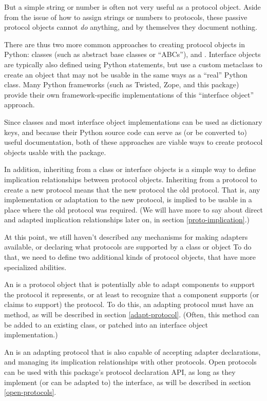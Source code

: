 But a simple string or number is often not very useful as a protocol
object.  Aside from the issue of how to assign strings or numbers to
protocols, these passive protocol objects cannot \emph{do} anything, and by
themselves they document nothing.

There are thus two more common approaches to creating protocol objects in
Python: classes (such as abstract base classes or ``ABCs''), and .  Interface objects are typically also defined using Python
 statements, but use a custom metaclass to create an object
that may not be usable in the same ways as a ``real'' Python class.  Many
Python frameworks (such as Twisted, Zope, and this package) provide their own
framework-specific implementations of this ``interface object'' approach.

Since classes and most interface object implementations can be used as
dictionary keys, and because their Python source code can serve as (or
be converted to) useful documentation, both of these approaches are viable
ways to create protocol objects usable with the  package.

In addition, inheriting from a class or interface objects is a simple way to
define implication relationships between protocol objects.  Inheriting from a
protocol to create a new protocol means that the new protocol 
the old protocol.  That is, any implementation or adaptation to the new
protocol, is implied to be usable in a place where the old protocol was
required.  (We will have more to say about direct and adapted implication
relationships later on, in section \ref{proto-implication}.)

At this point, we still haven't described any mechanisms for making adapters
available, or declaring what protocols are supported by a class or object
To do that, we need to define two additional kinds of protocol objects, that
have more specialized abilities.

An  is a protocol object that is potentially able to
adapt components to support the protocol it represents, or at least to
recognize that a component supports (or claims to support) the protocol.  To
do this, an adapting protocol must have an  method, as
will be described in section \ref{adapt-protocol}.  (Often, this method
can be added to an existing class, or patched into an interface object
implementation.)



An  is an adapting protocol that is also capable of
accepting adapter declarations, and managing its implication relationships
with other protocols.  Open protocols can be used with this package's
protocol declaration API, as long as they implement (or can be adapted to)
the  interface, as will be described in section
\ref{open-protocols}.

